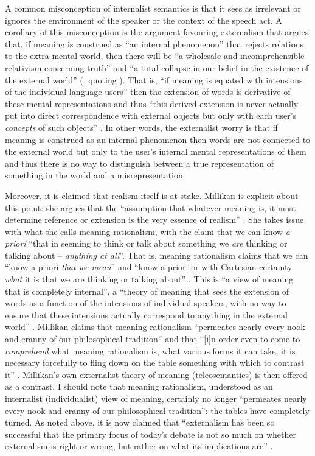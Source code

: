 A common misconception of internalist semantics is that it sees as irrelevant or ignores the environment of the speaker or the context of the speech act. A corollary of this misconception is the argument favouring externalism that argues that, if meaning is construed as “an internal phenomenon” that rejects relations to the extra-mental world, then there will be “a wholesale and incomprehensible relativism concerning truth” and “a total collapse in our belief in the existence of the external world” (\citealt[299]{Ferguson2009}, quoting \citealt[7]{Millikan1984}). That is, “if meaning is equated with intensions of the individual language users” then the extension of words is derivative of these mental representations and thus “this derived extension is never actually put into direct correspondence with external objects but only with each user’s \textit{concepts} of such objects” \citep[299-300, emphasis in original]{Ferguson2009}. In other words, the externalist worry is that if meaning is construed as an internal phenomenon then words are not connected to the external world but only to the user’s internal mental representations of them and thus there is no way to distinguish between a true representation of something in the world and a misrepresentation. 
	
Moreover, it is claimed that realism itself is at stake. Millikan is explicit about this point: she argues that the “assumption that whatever meaning is, it must determine reference or extension is the very essence of realism” \citep[329]{Millikan1984}. She takes issue with what she calls meaning rationalism, with the claim that we can know \textit{a priori} “that in seeming to think or talk about something we \textit{are} thinking or talking about – \textit{anything at all}”. That is, meaning rationalism claims that we can “know a priori \textit{that we mean}” and “know a priori or with Cartesian certainty \textit{what} it is that we are thinking or talking about” \citep[10, emphasis in original]{Millikan1984}. This is “a view of meaning that is completely internal”, a “theory of meaning that sees the extension of words as a function of the intensions of individual speakers, with no way to ensure that these intensions actually correspond to anything in the external world” \citep[299]{Ferguson2009}. Millikan claims that meaning rationalism “permeates nearly every nook and cranny of our philosophical tradition” and that “[i]n order even to come to \textit{comprehend} what meaning rationalism is, what various forms it can take, it is necessary forcefully to fling down on the table something with which to contrast it” \citep[92, emphasis in original]{Millikan1984}. Millikan’s own externalist theory of meaning (teleosemantics) is then offered as a contrast. I should note that meaning rationalism, understood as an internalist (individualist) view of meaning, certainly no longer “permeates nearly every nook and cranny of our philosophical tradition”: the tables have completely turned. As noted above, it is now claimed that “externalism has been so successful that the primary focus of today’s debate is not so much on whether externalism is right or wrong, but rather on what its implications are” \citep[158]{Wikforss2008}.

